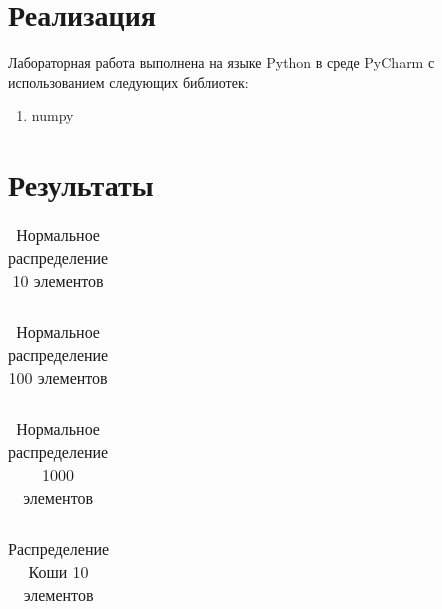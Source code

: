 \documentclass[a4paper]{article}
\begin{document}
    \section{Реализация}
        Лабораторная работа выполнена на языке Python в среде PyCharm с использованием следующих библиотек:
        \begin{enumerate}
            \item numpy
        \end{enumerate}
    \section{Результаты}
        \begin{table}[H]
            \centering
            \begin{tabular}{|c|c|c|c|c|c|}
                \hline
                
            \end{tabular}
            \caption{Нормальное распределение 10 элементов}
            \label{tab:norm_10}
        \end{table}

        \begin{table}[H]
            \centering
            \begin{tabular}{|c|c|c|c|c|c|}
                \hline
                
            \end{tabular}
            \caption{Нормальное распределение 100 элементов}
            \label{tab:norm_100}
        \end{table}

         \begin{table}[H]
            \centering
            \begin{tabular}{|c|c|c|c|c|c|}
                \hline
                
            \end{tabular}
            \caption{Нормальное распределение 1000 элементов}
            \label{tab:norm_1000}
        \end{table}

        \begin{table}[H]
            \centering
            \begin{tabular}{|c|c|c|c|c|c|}
                \hline
                
            \end{tabular}
            \caption{Распределение Коши 10 элементов}
            \label{tab:cauchy_10}
        \end{table}
\end{document}
